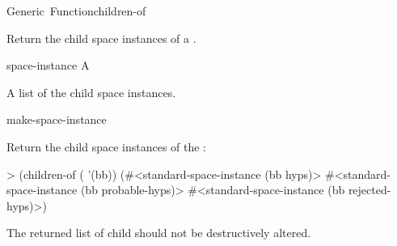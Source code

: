 \documentclass[10pt,twoside,english,pdftex]{article}
\begin{document}
\begin{functiondoc}{Generic~Function}{children-of}%
  {
    \returns{} }
%

\fnsyntax

\fnpurpose Return the child space instances of a .

\fnmethods
{}%
  {\code{(} 
    \returns{} }

\fnpackage {}

\fnmodule {}

\fnargs
\begin{args}{space-instance}
 A 
\end{args}

\fnreturns A list of the child space instances.

\begin{alsos}{make-space-instance}
\also[parent-of]
\end{alsos}

\fnexample
{}%
Return the child space instances  of the  :
%
\W\supp
\begin{example}
> (children-of ( '(bb))
(#<standard-space-instance (bb hyps)>
 #<standard-space-instance (bb probable-hyps)>
 #<standard-space-instance (bb rejected-hyps)>)
\end{example}

\fnnote The returned list of child  should not be
destructively altered.

\end{functiondoc}

\end{document}
